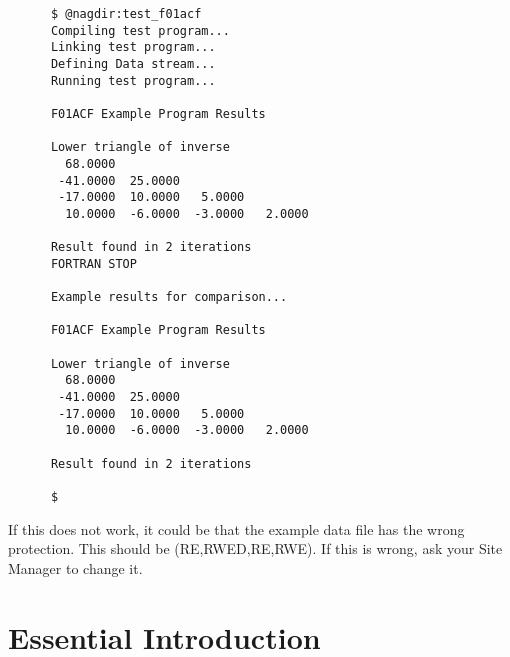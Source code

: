 \begin{small}
\begin{verbatim}
      $ @nagdir:test_f01acf
      Compiling test program...
      Linking test program...
      Defining Data stream...
      Running test program...

      F01ACF Example Program Results

      Lower triangle of inverse
        68.0000
       -41.0000  25.0000
       -17.0000  10.0000   5.0000
        10.0000  -6.0000  -3.0000   2.0000

      Result found in 2 iterations
      FORTRAN STOP

      Example results for comparison...

      F01ACF Example Program Results

      Lower triangle of inverse
        68.0000
       -41.0000  25.0000
       -17.0000  10.0000   5.0000
        10.0000  -6.0000  -3.0000   2.0000

      Result found in 2 iterations

      $
\end{verbatim}
\end{small}

If this does not work, it could be that the example data file has the wrong
protection. This should be (RE,RWED,RE,RWE). If this is wrong, ask your Site
Manager to change it.

\newpage
\section{Essential Introduction}
\label{se:essin}


